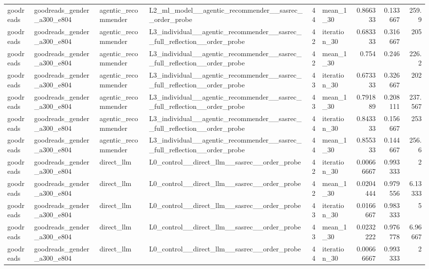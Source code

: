 \begin{table}[htbp!]
\begin{tabular}{llllrlrrr}
goodreads & goodreads\_gender\_a300\_e804 & agentic\_recommender & L2\_ml\_model\_\_agentic\_recommender\_\_sasrec\_\_order\_probe & 44 & mean\_1\_30 & 0.866333 & 0.133667 & 259.9 \\
goodreads & goodreads\_gender\_a300\_e804 & agentic\_recommender & L3\_individual\_\_agentic\_recommender\_\_sasrec\_\_full\_reflection\_\_order\_probe & 42 & iteration\_30 & 0.683333 & 0.316667 & 205 \\
goodreads & goodreads\_gender\_a300\_e804 & agentic\_recommender & L3\_individual\_\_agentic\_recommender\_\_sasrec\_\_full\_reflection\_\_order\_probe & 42 & mean\_1\_30 & 0.754 & 0.246 & 226.2 \\
goodreads & goodreads\_gender\_a300\_e804 & agentic\_recommender & L3\_individual\_\_agentic\_recommender\_\_sasrec\_\_full\_reflection\_\_order\_probe & 43 & iteration\_30 & 0.673333 & 0.326667 & 202 \\
goodreads & goodreads\_gender\_a300\_e804 & agentic\_recommender & L3\_individual\_\_agentic\_recommender\_\_sasrec\_\_full\_reflection\_\_order\_probe & 43 & mean\_1\_30 & 0.791889 & 0.208111 & 237.567 \\
goodreads & goodreads\_gender\_a300\_e804 & agentic\_recommender & L3\_individual\_\_agentic\_recommender\_\_sasrec\_\_full\_reflection\_\_order\_probe & 44 & iteration\_30 & 0.843333 & 0.156667 & 253 \\
goodreads & goodreads\_gender\_a300\_e804 & agentic\_recommender & L3\_individual\_\_agentic\_recommender\_\_sasrec\_\_full\_reflection\_\_order\_probe & 44 & mean\_1\_30 & 0.855333 & 0.144667 & 256.6 \\
goodreads & goodreads\_gender\_a300\_e804 & direct\_llm & L0\_control\_\_direct\_llm\_\_sasrec\_\_order\_probe & 42 & iteration\_30 & 0.00666667 & 0.993333 & 2 \\
goodreads & goodreads\_gender\_a300\_e804 & direct\_llm & L0\_control\_\_direct\_llm\_\_sasrec\_\_order\_probe & 42 & mean\_1\_30 & 0.0204444 & 0.979556 & 6.13333 \\
goodreads & goodreads\_gender\_a300\_e804 & direct\_llm & L0\_control\_\_direct\_llm\_\_sasrec\_\_order\_probe & 43 & iteration\_30 & 0.0166667 & 0.983333 & 5 \\
goodreads & goodreads\_gender\_a300\_e804 & direct\_llm & L0\_control\_\_direct\_llm\_\_sasrec\_\_order\_probe & 43 & mean\_1\_30 & 0.0232222 & 0.976778 & 6.96667 \\
goodreads & goodreads\_gender\_a300\_e804 & direct\_llm & L0\_control\_\_direct\_llm\_\_sasrec\_\_order\_probe & 44 & iteration\_30 & 0.00666667 & 0.993333 & 2 \\

\end{tabular}
\end{table}
